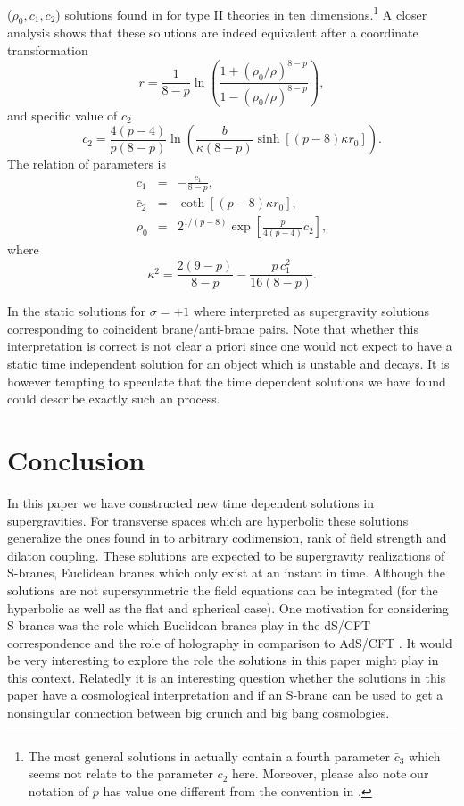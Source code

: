 \documentclass[a4paper,aps,nofootinbib,showpacs,preprint]{revtex4}
\begin{document}
($\rho_0,\bar c_1,\bar c_2$) solutions found in \cite{ZZ99,BMO01}
for type II theories in ten dimensions.\footnote{
%
The most general solutions in \cite{BMO01} actually contain a
fourth parameter $\bar c_3$ which seems not relate to the
parameter $c_2$ here. Moreover, please also note our notation of
$p$ has value one different from the convention in \cite{BMO01}.}
%
A closer analysis shows that these solutions are indeed
equivalent after a coordinate transformation
\begin{equation}
r = \frac1{8-p} \ln \left(
\frac{1+(\rho_0/\rho)^{8-p}}{1-(\rho_0/\rho)^{8-p}} \right),
\end{equation}
and specific value of $c_2$
\begin{equation}
c_2 = \frac{4(p-4)}{p(8-p)} \ln \left( \frac{b}{\kappa(8-p)}
\sinh[(p-8)\kappa r_0] \right).
\end{equation}
The relation of parameters is
\begin{eqnarray}
\bar c_1 &=& - \frac{c_1}{8-p}, \\
\bar c_2 &=& \coth[(p-8) \kappa r_0], \\
\rho_0 &=& 2^{1/(p-8)} \exp \left[ \frac{p}{4(p-4)} c_2 \right],
\end{eqnarray}
where
\begin{equation}
\kappa^2 = \frac{2(9-p)}{8-p} - \frac{p \, c_1^2}{16(8-p)}.
\end{equation}

In \cite{BMO01} the static solutions for $\sigma=+1$ where
interpreted as supergravity solutions corresponding to coincident
brane/anti-brane pairs. Note that whether this interpretation is
correct is not clear a priori since one would not expect to have
a static time independent solution for an object which is
unstable and decays. It is however tempting to speculate that the
time dependent solutions we have found could describe exactly
such an process.


\section{Conclusion}
In this paper we have constructed new time dependent solutions in
supergravities. For transverse spaces which are hyperbolic these
solutions generalize the ones found in \cite{GS02} to arbitrary
codimension, rank of field strength and dilaton coupling. These
solutions are expected to be supergravity realizations of
S-branes, Euclidean branes which only exist at an instant in
time. Although the solutions are not supersymmetric the field
equations can be integrated (for the hyperbolic as well as the
flat and spherical case). One motivation for considering S-branes
was the role which Euclidean branes play in the dS/CFT
correspondence and the role of holography in comparison to AdS/CFT
\cite{Ma98,GKP98,Wi98,AGMOO99}. It would be very interesting to
explore the role the solutions in this paper might play in this
context. Relatedly it is an interesting question whether the
solutions in this paper have a cosmological interpretation and if
an S-brane can be used to get a nonsingular connection between big
crunch and big bang cosmologies.
\end{document}
